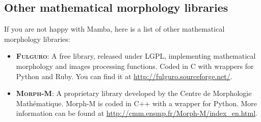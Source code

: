 \documentclass[a4paper,10pt,oneside]{article}
\begin{document}
\subsection{Other mathematical morphology libraries}

If you are not happy with Mamba, here is a list of other mathematical morphology
libraries:

\begin{itemize}
\item \textsc{\textbf{Fulguro}}: A free library, released under LGPL, implementing
mathematical morphology and images processing functions. Coded in C with wrappers
for Python and Ruby. You can find it at \url{http://fulguro.sourceforge.net/}.
\item \textsc{\textbf{Morph-M}}: A proprietary library developed by the Centre
de Morphologie Math\'{e}matique. Morph-M is coded in C++ with a wrapper for
Python. More information can be found at \url{http://cmm.ensmp.fr/Morph-M/index_en.html}.
\end{itemize}
\end{document}
